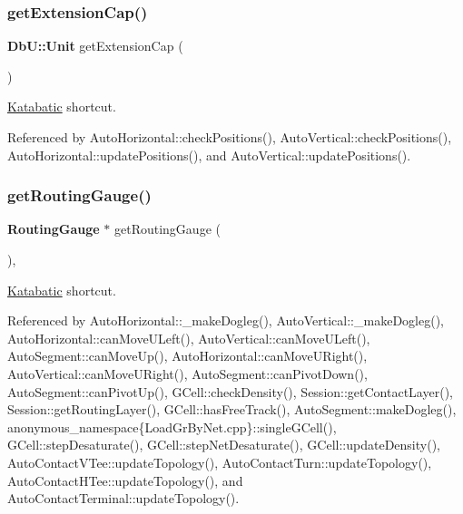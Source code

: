 \mbox{\label{classKatabatic_1_1Session_a909ce95ac840ee708f9a49366f0c2690}} 
\subsubsection{\texorpdfstring{get\+Extension\+Cap()}{getExtensionCap()}}
{\footnotesize\ttfamily \textbf{ Db\+U\+::\+Unit} get\+Extension\+Cap (\begin{DoxyParamCaption}{ }\end{DoxyParamCaption})\hspace{0.3cm}{\ttfamily [static]}}

\mbox{\hyperlink{namespaceKatabatic}{Katabatic}} shortcut. 

Referenced by Auto\+Horizontal\+::check\+Positions(), Auto\+Vertical\+::check\+Positions(), Auto\+Horizontal\+::update\+Positions(), and Auto\+Vertical\+::update\+Positions().

\mbox{\label{classKatabatic_1_1Session_a9a05289b33122f312aa2c88c4b023292}} 
\subsubsection{\texorpdfstring{get\+Routing\+Gauge()}{getRoutingGauge()}}
{\footnotesize\ttfamily \textbf{ Routing\+Gauge} $\ast$ get\+Routing\+Gauge (\begin{DoxyParamCaption}{ }\end{DoxyParamCaption})\hspace{0.3cm}{\ttfamily [inline]}, {\ttfamily [static]}}

\mbox{\hyperlink{namespaceKatabatic}{Katabatic}} shortcut. 

Referenced by Auto\+Horizontal\+::\+\_\+make\+Dogleg(), Auto\+Vertical\+::\+\_\+make\+Dogleg(), Auto\+Horizontal\+::can\+Move\+U\+Left(), Auto\+Vertical\+::can\+Move\+U\+Left(), Auto\+Segment\+::can\+Move\+Up(), Auto\+Horizontal\+::can\+Move\+U\+Right(), Auto\+Vertical\+::can\+Move\+U\+Right(), Auto\+Segment\+::can\+Pivot\+Down(), Auto\+Segment\+::can\+Pivot\+Up(), G\+Cell\+::check\+Density(), Session\+::get\+Contact\+Layer(), Session\+::get\+Routing\+Layer(), G\+Cell\+::has\+Free\+Track(), Auto\+Segment\+::make\+Dogleg(), anonymous\+\_\+namespace\{\+Load\+Gr\+By\+Net.\+cpp\}\+::single\+G\+Cell(), G\+Cell\+::step\+Desaturate(), G\+Cell\+::step\+Net\+Desaturate(), G\+Cell\+::update\+Density(), Auto\+Contact\+V\+Tee\+::update\+Topology(), Auto\+Contact\+Turn\+::update\+Topology(), Auto\+Contact\+H\+Tee\+::update\+Topology(), and Auto\+Contact\+Terminal\+::update\+Topology().

